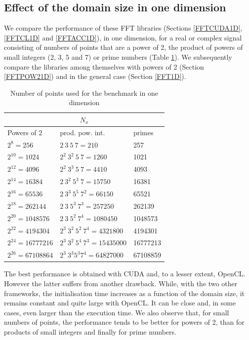 \documentclass[12pt, a4paper]{article}
\begin{document}
\subsection{Effect of the domain size in one dimension}\label{PERFORMANCE1D}
We compare the performance of these FFT libraries (Sections \ref{FFTCUDA1D}, \ref{FFTCL1D} and \ref{FFTACC1D}), in one dimension, for a real or complex signal consisting of numbers of points that are a power of 2, the product of powers of small integers (2, 3, 5 and 7) or prime numbers (Table \ref{1DSIZES}). We subsequently compare the libraries among themselves with powers of 2 (Section \ref{FFTPOW21D}) and in the general case (Section \ref{FFT1D}).\\ 
\begin{table}[H]
\centering
\begin{tabular}{|l|l|l|}
  \hline
  \multicolumn{3}{|c|}{$N_x$}\\
  \hline
  \hline
Powers of 2 & prod. pow. int. & primes\\ \hline
$2^8=256$ & $2\ 3\ 5\ 7 = 210$	& 257 \\ \hline
$2^{10}=1024$ & $2^2\ 3^2\ 5\ 7 = 1260$ & 1021 \\ \hline
$2^{12}=4096$ & $2^2\ 3^3\ 5\ 7 = 4410$ & 4093 \\ \hline
$2^{14}=16384$ & $2\ 3^2\ 5^3\ 7=15750$ & 16381 \\ \hline
$2^{16}=65536$ & $2\ 3^3\ 5^5\ 7^2 = 66150$ & 65521 \\ \hline
$2^{18}=262144$ & $2\ 3\ 5^3\ 7^3 = 257250$ & 262139 \\ \hline
$2^{20}=1048576$ & $2\ 3\ 5^2\ 7^4 = 1080450$ & 1048573 \\ \hline
$2^{22}=4194304$ & $2^3\ 3^2\ 5^2\ 7^4 = 4321800$ & 4194301 \\ \hline
$2^{24}=16777216$ & $2^3\ 3^2\ 5^4\ 7^3 = 15435000$ & 16777213 \\ \hline
$2^{26}=67108864$ & $2^3\ 3^3 5^3 7^4 = 64827000$ & 67108859 \\ \hline
\end{tabular}
\caption{Number of points used for the benchmark in one dimension}\label{1DSIZES}
\end{table}
The best performance is obtained with CUDA and, to a lesser extent, OpenCL. However the latter suffers from another drawback. While, with the two other frameworks, the initialisation time increases as a function of the domain size, it remains constant and quite large with OpenCL. It can be close and, in some cases, even larger than the execution time. We also observe that, for small numbers of points, the performance tends to be better for powers of 2, than for products of small integers and finally for prime numbers.
  
\end{document}
